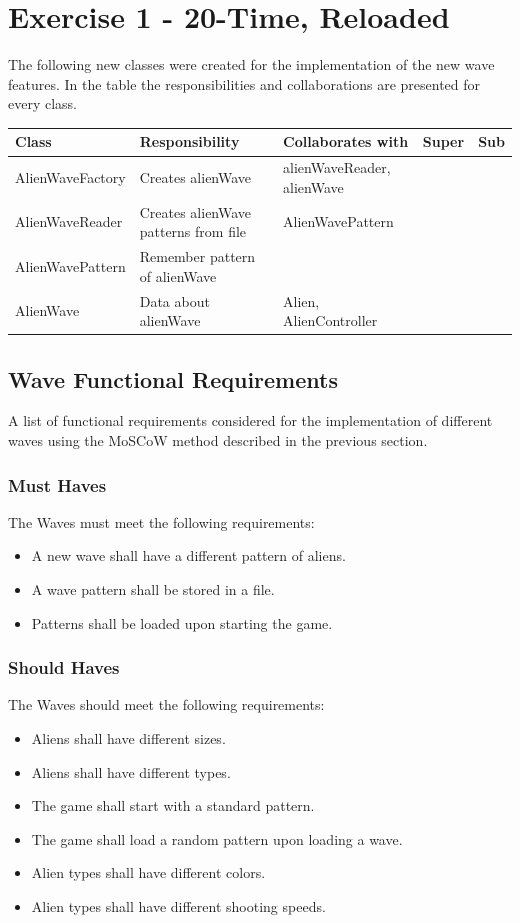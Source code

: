 \documentclass[10pt]{article}
\begin{document}
\section{Exercise 1 - 20-Time, Reloaded }
The following new classes were created for the implementation of the new wave features.
In the table the responsibilities and collaborations are presented for every class.
\begin{center}
    \begin{tabular}{ | p{3cm} | p{4cm} | p{3cm} | p{2cm} | p{3cm} |}
  \hline
    Class & Responsibility & Collaborates with & Super & Sub \\ \hline
   AlienWaveFactory &Creates alienWave & alienWaveReader, alienWave &  & \\ \hline
   AlienWaveReader & Creates alienWave patterns from file & AlienWavePattern &  & \\ \hline
   AlienWavePattern & Remember pattern of alienWave &  &  &  \\ \hline
   AlienWave &  Data about alienWave & Alien, AlienController  &  & \\ \hline

    \end{tabular}
\end{center}

\subsection{Wave Functional Requirements}

A list of functional requirements considered for the implementation of different waves using the MoSCoW method described in the previous section.

\subsubsection{Must Haves}
The Waves must meet the following requirements:
\begin{itemize}
	\item A new wave shall have a different pattern of aliens.
	\item A wave pattern shall be stored in a file.
	\item Patterns shall be loaded upon starting the game.
\end{itemize}

\subsubsection{Should Haves}
The Waves should meet the following requirements:
\begin{itemize}
	\item Aliens shall have different sizes.
	\item Aliens shall have different types.
	\item The game shall start with a standard pattern. 
	\item The game shall load a random pattern upon loading a wave.
	\item Alien types shall have different colors.
	\item Alien types shall have different shooting speeds.
\end{itemize}
\end{document}

